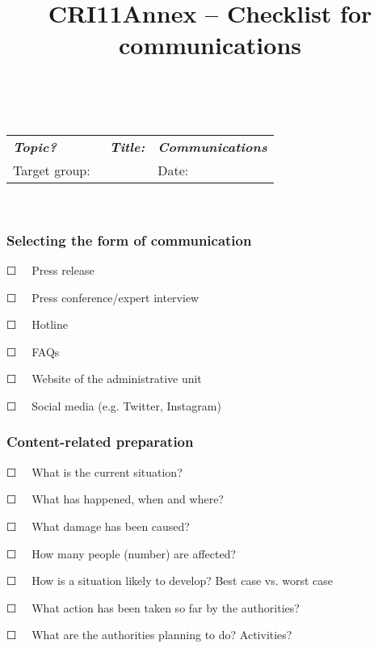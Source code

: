 \documentclass{article}
\begin{document}
\title{CRI11Annex – Checklist for communications}

\maketitle





 


\begin{tabu} to \textwidth { |X|X|X| }
\hline



\emph{\textbf{Topic?}} & \emph{\textbf{Title:}} & \emph{\textbf{Communications}}
 \\


Target group:  &  & Date:
 \\
\hline

\end{tabu}

 


\subsubsection{Selecting the form of communication}\label{H3683887}



☐   Press release


☐   Press conference/expert interview


☐   Hotline


☐   FAQs


☐   Website of the administrative unit


☐   Social media (e.g. Twitter, Instagram) 


\subsubsection{Content-related preparation }\label{H351953}



☐   What is the current situation?


☐   What has happened, when and where?


☐   What damage has been caused?


☐   How many people (number) are affected?


☐   How is a situation likely to develop? Best case vs. worst case


☐   What action has been taken so far by the authorities?


☐   What are the authorities planning to do? Activities?
\end{document}
